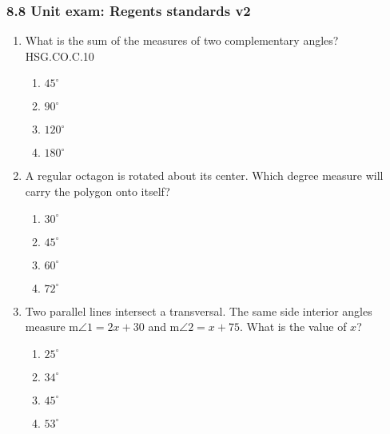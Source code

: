 \documentclass[12pt, twoside]{article}
\begin{document}
\subsubsection*{8.8 Unit exam: Regents standards \hfill v2}
\begin{enumerate}
\item What is the sum of the measures of two complementary angles? \hfill HSG.CO.C.10
\begin{multicols}{2}
\begin{enumerate}
  \item $45^\circ$
  \item $90^\circ$
  \item $120^\circ$
  \item $180^\circ$
\end{enumerate}
\end{multicols}

\item A regular octagon is rotated about its center. Which degree measure will carry the polygon onto itself? 
\begin{multicols}{2}
\begin{enumerate}
  \item $30^\circ$
  \item $45^\circ$
  \item $60^\circ$
  \item $72^\circ$
\end{enumerate}
\end{multicols}

\item Two parallel lines intersect a transversal. The same side interior angles measure m$\angle 1 = 2x+30$ and m$\angle 2 = x+75$. What is the value of $x$?
\begin{multicols}{2}
  \begin{enumerate}
    \item $25^\circ$
    \item $34^\circ$
    \item $45^\circ$
    \item $53^\circ$
  \end{enumerate}
  \end{multicols}


\end{enumerate}
\end{document}
